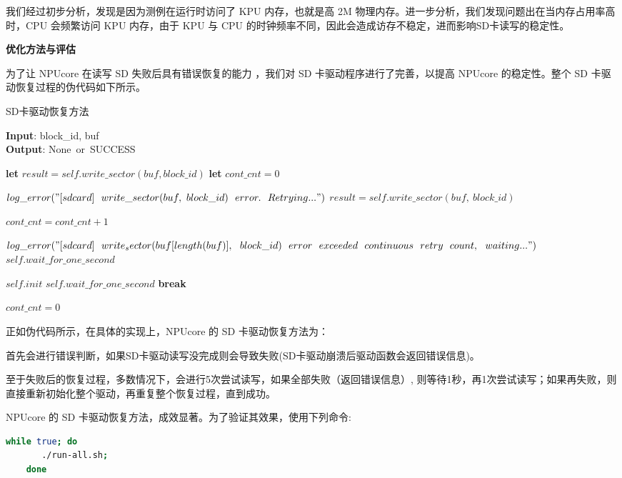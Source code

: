 我们经过初步分析，发现是因为测例在运行时访问了 KPU 内存，也就是高 2M 物理内存。进一步分析，我们发现问题出在当内存占用率高时，CPU 会频繁访问 KPU 内存，由于 KPU 与 CPU 的时钟频率不同，因此会造成访存不稳定，进而影响SD卡读写的稳定性。

\textbf{优化方法与评估}

为了让 NPUcore 在读写 SD 失败后具有错误恢复的能力 ，我们对 SD 卡驱动程序进行了完善，以提高 NPUcore 的稳定性。整个 SD 卡驱动恢复过程的伪代码如下所示。

\begin{algorithm}[tb]
	\caption{SD卡驱动恢复方法}
	\label{alg:sdcard recovery}
	\textbf{Input}: block\_id, buf\\
	\textbf{Output}: None~or~SUCCESS
	\begin{algorithmic}[1] %
		
		\State \textbf{let} $result = self.write\_sector(buf, block\_id)$
		\State \textbf{let} $cont\_cnt = 0$
		
		\State $log\_error("[sdcard]~~write\_sector(buf,~block\_id)~~error.~~Retrying...")$
		\State $result=self.write\_sector(buf,~block\_id)$
		\EndIf
		
		\State $cont\_cnt = cont\_cnt + 1$
		
		\State $log\_error("[sdcard]~~write_sector(buf[length(buf)],~~block\_id)~~error~~exceeded~~continuous~~retry~~count,~~waiting...")$
		\State $self.wait\_for\_one\_second$
		
		\State $self.init$
		\State $self.wait\_for\_one\_second$
		\Else
		\State \textbf{break}
		\EndIf
		
		\State $cont\_cnt = 0$
		\EndIf
		\EndWhile
	\end{algorithmic}
\end{algorithm}

正如伪代码所示，在具体的实现上，NPUcore 的 SD 卡驱动恢复方法为：

首先会进行错误判断，如果SD卡驱动读写没完成则会导致失败(SD卡驱动崩溃后驱动函数会返回错误信息)。

至于失败后的恢复过程，多数情况下，会进行5次尝试读写，如果全部失败（返回错误信息）, 则等待1秒，再1次尝试读写；如果再失败，则直接重新初始化整个驱动，再重复整个恢复过程，直到成功。

NPUcore 的 SD 卡驱动恢复方法，成效显著。为了验证其效果，使用下列命令:

\begin{lstlisting}[language=bash]
	while true; do 
	   ./run-all.sh; 
	done
\end{lstlisting}

